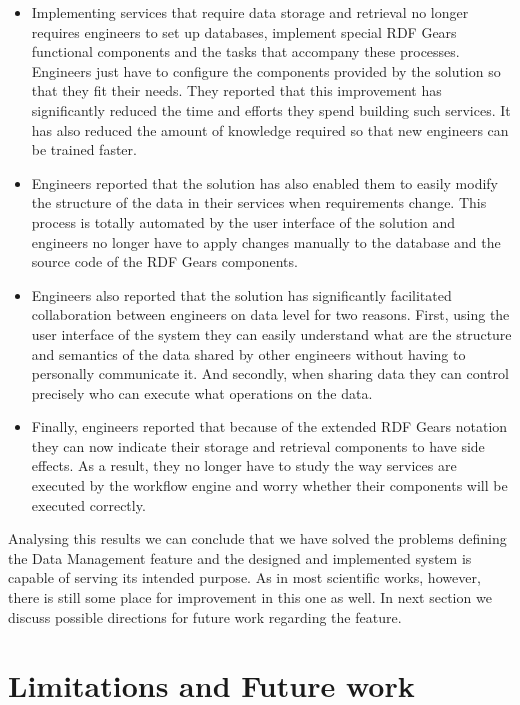 \begin{itemize}

\item Implementing services that require data storage and retrieval no longer requires engineers to set up databases, implement special RDF Gears functional components and the tasks that accompany these processes. Engineers just have to configure the components provided by the solution so that they fit their needs. They reported that this improvement has significantly reduced the time and efforts they spend building such services. It has also reduced the amount of knowledge required so that new engineers can be trained faster.

\item Engineers reported that the solution has also enabled them to easily modify the structure of the data in their services when requirements change. This process is totally automated by the user interface of the solution and engineers no longer have to apply changes manually to the database and the source code of the RDF Gears components.

\item Engineers also reported that the solution has significantly facilitated collaboration between engineers on data level for two reasons. First, using the user interface of the system they can easily understand what are the structure and semantics of the data shared by other engineers without having to personally communicate it. And secondly, when sharing data they can control precisely who can execute what operations on the data. 

\item Finally, engineers reported that because of the extended RDF Gears notation they can now indicate their storage and retrieval components to have side effects. As a result, they no longer have to study the way services are executed by the workflow engine and worry whether their components will be executed correctly. 
	
\end{itemize}

Analysing this results we can conclude that we have solved the problems defining the Data Management feature and the designed and implemented system is capable of serving its intended purpose. As in most scientific works, however, there is still some place for improvement in this one as well. In next section we discuss possible directions for future work regarding the feature.

\section{Limitations and Future work}
\label{sec:limitsStorage}

